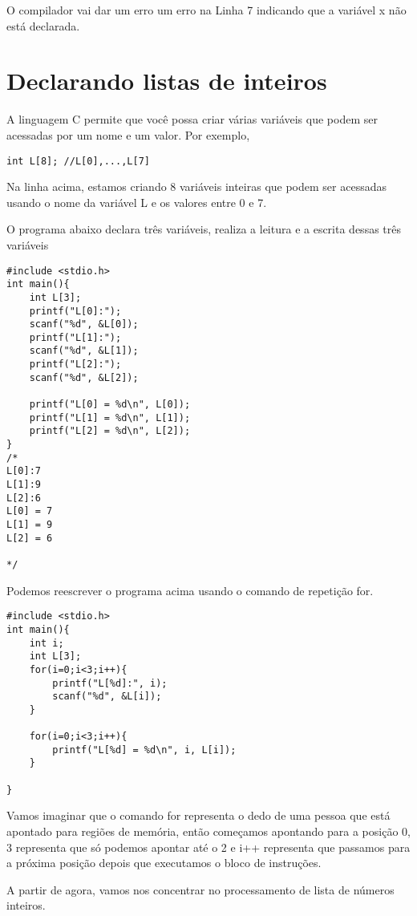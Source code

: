 \documentclass[a4paper,11pt]{article}
\begin{document}
O compilador vai dar um erro um erro na Linha 7 indicando que a variável x não está declarada.

\section*{Declarando listas de inteiros}

A linguagem C permite que você possa criar várias variáveis que podem ser acessadas por um nome e um valor. Por exemplo,

\begin{verbatim}
int L[8]; //L[0],...,L[7]
\end{verbatim}

Na linha acima, estamos criando 8 variáveis inteiras que podem ser acessadas usando o nome da variável L e os valores entre 0 e 7.

O programa abaixo declara três variáveis, realiza a leitura e a escrita dessas três variáveis
\begin{verbatim}
#include <stdio.h>
int main(){
	int L[3];
	printf("L[0]:");
	scanf("%d", &L[0]);
	printf("L[1]:");
	scanf("%d", &L[1]);
	printf("L[2]:");
	scanf("%d", &L[2]);
	
	printf("L[0] = %d\n", L[0]);
	printf("L[1] = %d\n", L[1]);
	printf("L[2] = %d\n", L[2]);
}
/*
L[0]:7
L[1]:9
L[2]:6
L[0] = 7
L[1] = 9
L[2] = 6

*/
\end{verbatim}


Podemos reescrever o programa acima usando o comando de repetição for.

\begin{verbatim}
#include <stdio.h>
int main(){
	int i;
	int L[3];
	for(i=0;i<3;i++){
		printf("L[%d]:", i);
		scanf("%d", &L[i]);
	}
	
	for(i=0;i<3;i++){
		printf("L[%d] = %d\n", i, L[i]);
	}
	
}
\end{verbatim}

Vamos imaginar que o comando for representa o dedo de uma pessoa que está apontado para regiões de memória, então começamos apontando para a posição 0, 3 representa que só podemos apontar até o 2 e i++ representa que passamos para a próxima posição depois que executamos o bloco de instruções.

A partir de agora, vamos nos concentrar no processamento de lista de números inteiros.
\end{document}
